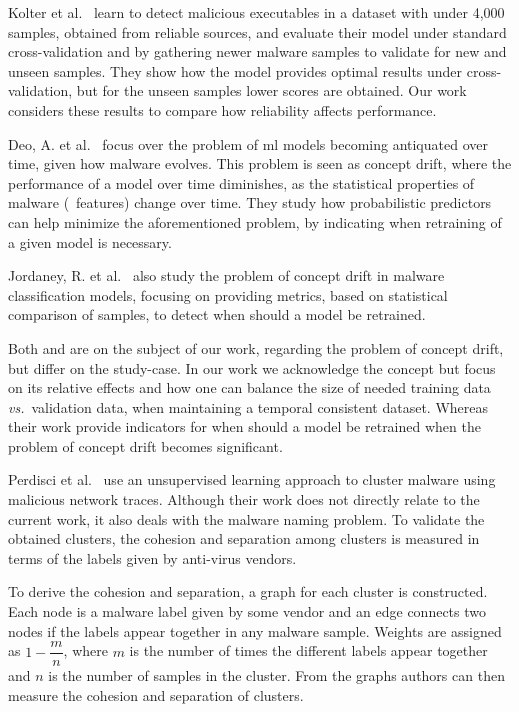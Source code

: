 \medskip

Kolter et al.~\cite{kolter:learning} learn to detect malicious executables in a dataset with under 4,000 samples, obtained from reliable sources, and evaluate their model under standard cross-validation and by gathering newer malware samples to validate for new and unseen samples.
They show how the model provides optimal results under cross-validation, but for the unseen samples lower scores are obtained.
Our work considers these results to compare how reliability affects performance.

Deo, A. et al.~\cite{deo2016prescience} focus over the problem of \gls{ml} models becoming antiquated over time, given how malware evolves.
This problem is seen as concept drift, where the performance of a model over time diminishes, as the statistical properties of malware (\ie\ features) change over time.
They study how probabilistic predictors can help minimize the aforementioned problem, by indicating when retraining of a given model is necessary. 

Jordaney, R. et al.~\cite{jordaney2017transcend} also study the problem of concept drift in malware classification models, focusing on providing metrics, based on statistical comparison of samples, to detect when should a model be retrained. 

Both \cite{deo2016prescience} and \cite{jordaney2017transcend} are on the subject of our work, regarding the problem of concept drift, but differ on the study-case.
In our work we acknowledge the concept but focus on its relative effects and how one can balance the size of needed training data \textit{vs.}\ validation data, when maintaining a temporal consistent dataset.
Whereas their work provide indicators for when should a model be retrained when the problem of concept drift becomes significant.

\medskip

Perdisci et al.~\cite{perdisci:behavior} use an unsupervised learning approach to cluster malware using malicious network traces.
Although their work does not directly relate to the current work, it also deals with the malware naming problem.
To validate the obtained clusters, the cohesion and separation among clusters is measured in terms of the labels given by anti-virus vendors.

To derive the cohesion and separation, a graph for each cluster is constructed.
Each node is a malware label given by some vendor and an edge connects two nodes if the labels appear together in any malware sample.
Weights are assigned as $1 - \dfrac{m}{n}$, where $m$ is the number of times the different labels appear together and $n$ is the number of samples in the cluster.
From the graphs authors can then measure the cohesion and separation of clusters.


